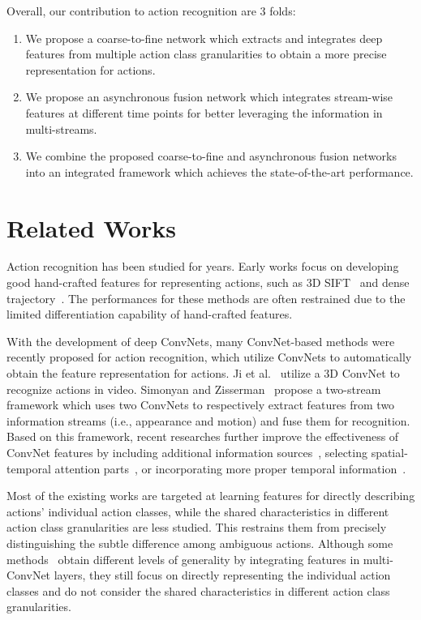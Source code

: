 \documentclass[letterpaper]{article}
\begin{document}
Overall, our contribution to action recognition are 3 folds:
\begin{enumerate}
 \item We propose a coarse-to-fine network which extracts and integrates deep features from multiple action class granularities to obtain a more precise representation for actions.
 \item We propose an asynchronous fusion network which integrates stream-wise features at different time points for better leveraging the information in multi-streams.
 \item We combine the proposed coarse-to-fine and asynchronous fusion networks into an integrated framework which achieves the state-of-the-art performance.
\end{enumerate}



\section{Related Works\label{section:related_work}}

Action recognition has been studied for years. Early works focus on developing good hand-crafted features for representing actions, such as 3D SIFT~\cite{3dsift} and dense trajectory~\cite{iDT}. The performances for these methods are often restrained due to the limited differentiation capability of hand-crafted features.

With the development of deep ConvNets, many ConvNet-based methods were recently proposed for action recognition, which utilize ConvNets to automatically obtain the feature representation for actions. Ji et al.~\cite{3dcnn2} utilize a 3D ConvNet to recognize actions in video. Simonyan and Zisserman~\cite{baseline} propose a two-stream framework which uses two ConvNets to respectively extract features from two information streams (i.e., appearance and motion) and fuse them for recognition. Based on this framework, recent researches further improve the effectiveness of ConvNet features by including additional information sources~\cite{3stream,3stream2}, selecting spatial-temporal attention parts~\cite{kar2016adascan,visualattention,KVMF}, or incorporating more proper temporal information~\cite{TSN,wumultifusion,cherian2017generalized,DIN}.

Most of the existing works are targeted at learning features for directly describing actions' individual action classes, while the shared characteristics in different action class granularities are less studied. This restrains them from precisely distinguishing the subtle difference among ambiguous actions. Although some methods~\cite{jointattention} obtain different levels of generality by integrating features in multi-ConvNet layers, they still focus on directly representing the individual action classes and do not consider the shared characteristics in different action class granularities.
\end{document}

